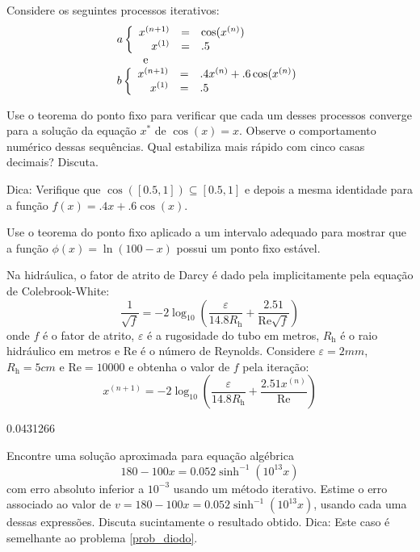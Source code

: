 \begin{Exercise} Considere os seguintes processos iterativos:
\begin{equation}
\begin{array}{l}
a\left\{\begin{array}{rcl}
x^{(n+1)}&=&\cos(x^{(n)})\\
x^{(1)}&=&.5
\end{array}
\right. \\ \qquad \hbox { e }\\
b\left\{\begin{array}{rcl}
x^{(n+1)}&=&.4x^{(n)}+.6\cos(x^{(n)})\\
x^{(1)}&=&.5
\end{array}
\right.
\end{array}
\end{equation}

Use o teorema do ponto fixo para verificar que cada um desses processos converge para a solução da equação $x^*$ de $\cos(x)=x$. Observe o comportamento numérico dessas sequências. Qual estabiliza mais rápido com cinco casas decimais? Discuta.

Dica: Verifique que $\cos([0.5,1])\subseteq [0.5,1]$ e depois a mesma identidade para a função $f(x)=.4x+.6\cos(x)$.
\end{Exercise}


\begin{Exercise}  Use o teorema do ponto fixo aplicado a um intervalo adequado para mostrar que a função $\phi(x)=\ln (100-x)$ possui um ponto fixo estável.
\end{Exercise}

\begin{Exercise}[title=Fluidos] Na hidráulica, o fator de atrito de Darcy é dado pela implicitamente pela equação de Colebrook-White:
$$\frac{1}{\sqrt{f}}= -2 \log_{10} \left( \frac{\varepsilon}{14.8 R_\mathrm{h}} + \frac{2.51}{\mathrm{Re}\sqrt{f}} \right)$$
onde $f$ é o fator de atrito, $\varepsilon$ é a rugosidade do tubo em metros, $R_\mathrm{h}$ é o raio hidráulico em metros e $\mathrm{Re}$ é o número de Reynolds. Considere $\varepsilon=2mm$, $R_\mathrm{h}=5cm$ e $\mathrm{Re}=10000$ e obtenha o valor de $f$ pela iteração:
$$x^{(n+1)}=-2 \log_{10} \left( \frac{\varepsilon}{14.8 R_\mathrm{h}} + \frac{2.51x^{(n)}}{\mathrm{Re}} \right)$$
\end{Exercise}
\begin{Answer}
0.0431266
\end{Answer}

\begin{Exercise} Encontre uma solução aproximada para equação algébrica
$$180-100x=0.052\sinh^{-1}(10^{13}x)$$
com erro absoluto inferior a $10^{-3}$ usando um método iterativo.
Estime o erro associado ao valor de $v=180-100x=0.052\sinh^{-1}(10^{13}x)$, usando cada uma dessas expressões. Discuta sucintamente o resultado obtido. Dica: Este caso é semelhante ao problema \ref{prob_diodo}.
\end{Exercise}

